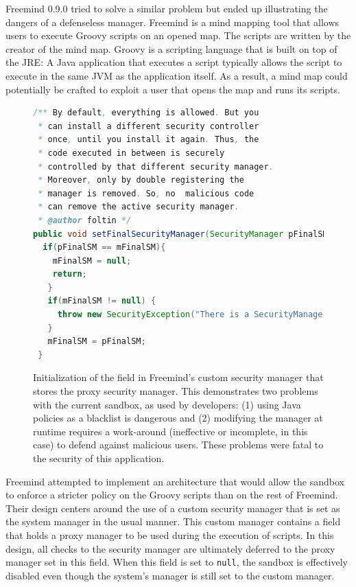 \documentclass{sig-alternate}
\begin{document}
Freemind 0.9.0 tried to solve a similar problem but ended up illustrating
the dangers of a defenseless manager. Freemind is a mind mapping tool
that allows users to execute Groovy scripts on an opened map. The
scripts are written by the creator of the mind map. Groovy is a scripting
language that is built on top of the JRE: A Java application that
executes a script typically allows the script to execute in the same
JVM as the application itself. As a result, a mind map could potentially
be crafted to exploit a user that opens the map and runs its scripts.

\begin{figure}
\begin{lstlisting}[language=Java,firstnumber=31]
/** By default, everything is allowed. But you
 * can install a different security controller
 * once, until you install it again. Thus, the
 * code executed in between is securely
 * controlled by that different security manager.  
 * Moreover, only by double registering the
 * manager is removed. So, no  malicious code 
 * can remove the active security manager.  
 * @author foltin */
public void setFinalSecurityManager(SecurityManager pFinalSM) {
  if(pFinalSM == mFinalSM){
    mFinalSM = null;
    return;
   } 		
   if(mFinalSM != null) {
     throw new SecurityException("There is a SecurityManager installed already."); 		
   } 		
   mFinalSM = pFinalSM;
 }	
\end{lstlisting}
\caption{Initialization of the field in Freemind's custom security
  manager\label{fig:Freemind-Security-Manager} that stores the proxy security
  manager. This demonstrates two problems with the current sandbox, as used by developers: (1) 
  using Java policies as a blacklist is
  dangerous and (2) modifying the manager at runtime requires 
  a work-around (ineffective or incomplete, in this case) to defend against malicious
  users. These problems were fatal to the security of this application.}
\end{figure}

Freemind attempted to implement an architecture that would allow the
sandbox to enforce a stricter policy on the Groovy scripts than on
the rest of Freemind. Their design centers around the use of a custom
security manager that is set as the system manager in the usual manner.
This custom manager contains a field that holds a proxy manager to be used during the execution of
scripts. In this design, all checks to the security manager are ultimately
deferred to the proxy manager set in this field. When
this field is set to \texttt{null}, the sandbox is effectively disabled
even though the system's manager is still set to the custom manager.
\end{document}

